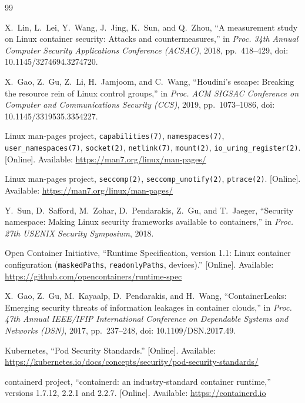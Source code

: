 \begin{thebibliography}{99}
\small
\setlength{\itemsep}{2pt}

 X.~Lin, L.~Lei, Y.~Wang, J.~Jing, K.~Sun, and Q.~Zhou, ``A measurement study on Linux container security: Attacks and countermeasures,'' in \emph{Proc. 34th Annual Computer Security Applications Conference (ACSAC)}, 2018, pp.~418--429, doi: 10.1145/3274694.3274720.

 X.~Gao, Z.~Gu, Z.~Li, H.~Jamjoom, and C.~Wang, ``Houdini's escape: Breaking the resource rein of Linux control groups,'' in \emph{Proc. ACM SIGSAC Conference on Computer and Communications Security (CCS)}, 2019, pp.~1073--1086, doi: 10.1145/3319535.3354227.

 Linux man-pages project, \texttt{capabilities(7)}, \texttt{namespaces(7)}, \texttt{user\_namespaces(7)}, \texttt{socket(2)}, \texttt{netlink(7)}, \texttt{mount(2)}, \texttt{io\_uring\_register(2)}. [Online]. Available: \url{https://man7.org/linux/man-pages/}

 Linux man-pages project, \texttt{seccomp(2)}, \texttt{seccomp\_unotify(2)}, \texttt{ptrace(2)}. [Online]. Available: \url{https://man7.org/linux/man-pages/}

 Y.~Sun, D.~Safford, M.~Zohar, D.~Pendarakis, Z.~Gu, and T.~Jaeger, ``Security namespace: Making Linux security frameworks available to containers,'' in \emph{Proc. 27th USENIX Security Symposium}, 2018.

 Open Container Initiative, ``Runtime Specification, version 1.1: Linux container configuration (\texttt{maskedPaths}, \texttt{readonlyPaths}, devices).'' [Online]. Available: \url{https://github.com/opencontainers/runtime-spec}

 X.~Gao, Z.~Gu, M.~Kayaalp, D.~Pendarakis, and H.~Wang, ``ContainerLeaks: Emerging security threats of information leakages in container clouds,'' in \emph{Proc. 47th Annual IEEE/IFIP International Conference on Dependable Systems and Networks (DSN)}, 2017, pp.~237--248, doi: 10.1109/DSN.2017.49.

 Kubernetes, ``Pod Security Standards.'' [Online]. Available: \url{https://kubernetes.io/docs/concepts/security/pod-security-standards/}

 containerd project, ``containerd: an industry-standard container runtime,'' versions 1.7.12, 2.2.1 and 2.2.7. [Online]. Available: \url{https://containerd.io}


\end{thebibliography}
